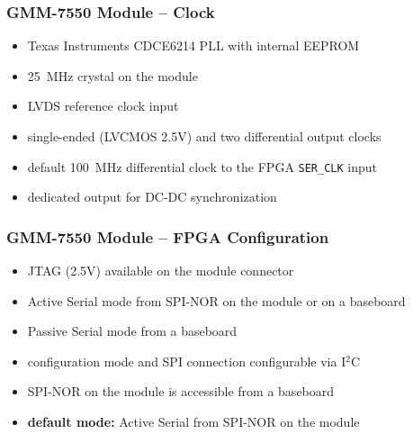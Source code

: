 \begin{frame}
  \frametitle{GMM-7550 Module -- Clock}
  \begin{itemize}
  \item Texas Instruments CDCE6214 PLL with internal EEPROM
  \item 25~MHz crystal on the module
  \item LVDS reference clock input
  \item single-ended (LVCMOS 2.5V) and two differential output clocks
  \item default 100~MHz differential clock to the FPGA \texttt{SER\_CLK} input
  \item dedicated output for DC-DC synchronization
  \end{itemize}
\end{frame}

\begin{frame}
  \frametitle{GMM-7550 Module -- FPGA Configuration}
  \begin{itemize}
  \item JTAG (2.5V) available on the module connector
  \item Active Serial mode from SPI-NOR on the module or on a
  baseboard
  \item Passive Serial mode from a baseboard
  \item configuration mode and SPI connection configurable via I$^2$C
  \item SPI-NOR on the module is accessible from a baseboard
  \item \textbf{default mode:} Active Serial from SPI-NOR on the module
  \end{itemize}
\end{frame}


